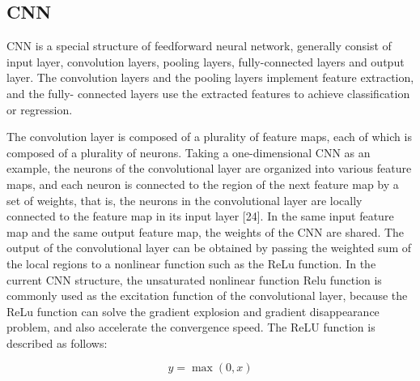 \documentclass[journal]{IEEEtran}
\begin{document}
\subsection{CNN}
CNN is a special structure of feedforward neural network, generally consist of input layer, convolution layers, pooling layers, fully-connected layers and output layer. The convolution layers and the pooling layers implement feature extraction, and the fully- connected layers use the extracted features to achieve classification or regression.

The convolution layer is composed of a plurality of feature maps, each of which is composed of a plurality of neurons. Taking a one-dimensional CNN as an example, the neurons of the convolutional layer are organized into various feature maps, and each neuron is connected to the region of the next feature map by a set of weights, that is, the neurons in the convolutional layer are locally connected to the feature map in its input layer [24]. In the same input feature map and the same output feature map, the weights of the CNN are shared. The output of the convolutional layer can be obtained by passing the weighted sum of the local regions to a nonlinear function such as the ReLu function. In the current CNN structure, the unsaturated nonlinear function Relu function is commonly used as the excitation function of the convolutional layer, because the ReLu function can solve the gradient explosion and gradient disappearance problem, and also accelerate the convergence speed. The ReLU function is described as follows:

\begin{equation}
y=\max(0,x)
\end{equation}
\end{document}
